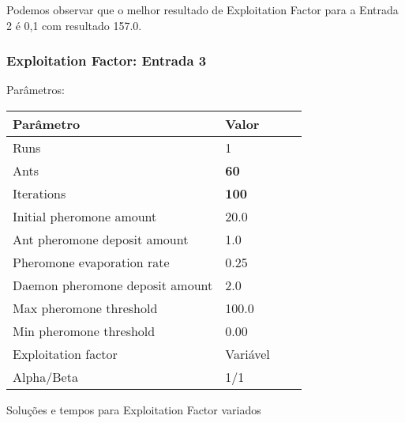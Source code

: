 \documentclass{article}
\begin{document}
\par
Podemos observar que o melhor resultado de Exploitation Factor para a Entrada 2 é 0,1 com resultado 157.0. 


\newpage









\subsubsection{Exploitation Factor: Entrada 3}
\par Parâmetros:
\newline
\begin{center}
    \begin{tabular}{| l | l | l | l |}
    \hline
    Parâmetro & Valor \\ \hline
    Runs & 1 \\ \hline
    Ants & \textbf{60} \\ \hline
    Iterations & \textbf{100} \\ \hline
    Initial pheromone amount & 20.0 \\ \hline
    Ant pheromone deposit amount & 1.0 \\ \hline
    Pheromone evaporation rate & 0.25 \\ \hline
    Daemon pheromone deposit amount & 2.0 \\ \hline
    Max pheromone threshold & 100.0 \\ \hline
    Min pheromone threshold & 0.00 \\ \hline
    Exploitation factor & Variável \\ \hline
    Alpha/Beta & 1/1 \\ \hline
    \end{tabular}
\end{center}

\par
Soluções e tempos para Exploitation Factor variados
\newline
\pgfplotsset{compat=newest}
\end{document}
